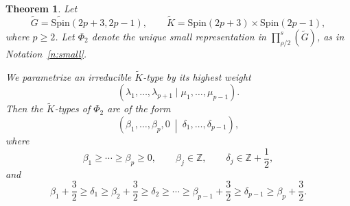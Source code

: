 \documentclass{amsart}
\newcommand{\bbZ}{{\mathbb Z}}
\newcommand{\cal}{\mathcal}
\newcommand{\Spin}{{\mathrm{Spin}}}
\newtheorem{thm}{Theorem}[section]
\newtheorem{remark}[thm]{Remark}
\theoremstyle{definition}
\newcommand{\tu}{\widetilde}
\begin{document}

\begin{thm}\label{thm:K-types-2p3}
Let
\[
\tu G=\tu{\Spin}(2p+3,2p-1),
\qquad
\tu K=\Spin(2p+3)\times\Spin(2p-1),
\]
where \(p\geq2\). Let \(\Phi_2\) denote the unique small representation in
\(\prod_{\rho/2}^s(\tu G)\), as in Notation~\ref{n:small}.

We parametrize an irreducible \(\tu K\)-type by its highest weight
\[
(\lambda_1,\ldots,\lambda_{p+1}
 \mid
 \mu_1,\ldots,\mu_{p-1}).
\]
Then the \(\tu K\)-types of \(\Phi_2\) are of the form
\begin{equation}\label{e:2p3-2p1-K}
\left(
\beta_1,\ldots,\beta_p,0
\ \middle|\
\delta_1,\ldots,\delta_{p-1}
\right),
\end{equation}
where
\[
\beta_1\geq\cdots\geq\beta_p\geq0,
\qquad
\beta_j\in\bbZ,
\qquad
\delta_j\in\bbZ+\frac12,
\]
and
\[
\beta_1+\frac32
\geq\delta_1
\geq\beta_2+\frac32
\geq\delta_2
\geq\cdots
\geq\beta_{p-1}+\frac32
\geq\delta_{p-1}
\geq\beta_p+\frac32.
\]
\end{thm}
\end{document}
